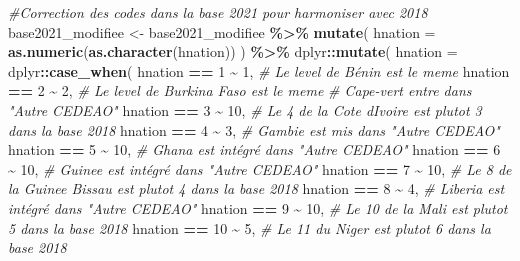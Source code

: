 \documentclass[
]{article}
\newenvironment{Shaded}{\begin{snugshade}}{\end{snugshade}}
\newcommand{\AttributeTok}[1]{\textcolor[rgb]{0.13,0.29,0.53}{#1}}
\newcommand{\CommentTok}[1]{\textcolor[rgb]{0.56,0.35,0.01}{\textit{#1}}}
\newcommand{\DecValTok}[1]{\textcolor[rgb]{0.00,0.00,0.81}{#1}}
\newcommand{\FunctionTok}[1]{\textcolor[rgb]{0.13,0.29,0.53}{\textbf{#1}}}
\newcommand{\NormalTok}[1]{#1}
\newcommand{\OtherTok}[1]{\textcolor[rgb]{0.56,0.35,0.01}{#1}}
\newcommand{\SpecialCharTok}[1]{\textcolor[rgb]{0.81,0.36,0.00}{\textbf{#1}}}
\begin{document}
\begin{Shaded}
\begin{Highlighting}[]
\CommentTok{\#Correction des codes dans la base 2021 pour harmoniser avec 2018}
\NormalTok{base2021\_modifiee }\OtherTok{\textless{}{-}}\NormalTok{ base2021\_modifiee }\SpecialCharTok{\%\textgreater{}\%}
  \FunctionTok{mutate}\NormalTok{(}
    \AttributeTok{hnation =} \FunctionTok{as.numeric}\NormalTok{(}\FunctionTok{as.character}\NormalTok{(hnation))}
\NormalTok{  ) }\SpecialCharTok{\%\textgreater{}\%}
\NormalTok{dplyr}\SpecialCharTok{::}\FunctionTok{mutate}\NormalTok{(}
    \AttributeTok{hnation =}\NormalTok{ dplyr}\SpecialCharTok{::}\FunctionTok{case\_when}\NormalTok{(}
\NormalTok{      hnation }\SpecialCharTok{==} \DecValTok{1} \SpecialCharTok{\textasciitilde{}} \DecValTok{1}\NormalTok{,    }\CommentTok{\# Le level de Bénin est le meme}
\NormalTok{      hnation }\SpecialCharTok{==} \DecValTok{2} \SpecialCharTok{\textasciitilde{}} \DecValTok{2}\NormalTok{,    }\CommentTok{\# Le level de Burkina Faso est le meme}
      \CommentTok{\# Cape{-}vert entre dans "Autre CEDEAO"}
\NormalTok{      hnation }\SpecialCharTok{==} \DecValTok{3} \SpecialCharTok{\textasciitilde{}} \DecValTok{10}\NormalTok{,}
      \CommentTok{\# Le 4 de la Cote d\textquotesingle{}Ivoire est plutot 3 dans la base 2018}
\NormalTok{      hnation }\SpecialCharTok{==} \DecValTok{4} \SpecialCharTok{\textasciitilde{}} \DecValTok{3}\NormalTok{,   }
      \CommentTok{\# Gambie est mis dans "Autre CEDEAO"}
\NormalTok{      hnation }\SpecialCharTok{==} \DecValTok{5} \SpecialCharTok{\textasciitilde{}} \DecValTok{10}\NormalTok{,}
      \CommentTok{\# Ghana est intégré dans "Autre CEDEAO"}
\NormalTok{      hnation }\SpecialCharTok{==} \DecValTok{6} \SpecialCharTok{\textasciitilde{}} \DecValTok{10}\NormalTok{,  }
      \CommentTok{\# Guinee est intégré dans "Autre CEDEAO"}
\NormalTok{      hnation }\SpecialCharTok{==} \DecValTok{7} \SpecialCharTok{\textasciitilde{}} \DecValTok{10}\NormalTok{,}
      \CommentTok{\# Le 8 de la Guinee Bissau est plutot 4 dans la base 2018}
\NormalTok{      hnation }\SpecialCharTok{==} \DecValTok{8} \SpecialCharTok{\textasciitilde{}} \DecValTok{4}\NormalTok{,    }
      \CommentTok{\# Liberia est intégré dans "Autre CEDEAO"}
\NormalTok{      hnation }\SpecialCharTok{==} \DecValTok{9} \SpecialCharTok{\textasciitilde{}} \DecValTok{10}\NormalTok{,}
      \CommentTok{\# Le 10 de la Mali est plutot 5 dans la base 2018}
\NormalTok{      hnation }\SpecialCharTok{==} \DecValTok{10} \SpecialCharTok{\textasciitilde{}} \DecValTok{5}\NormalTok{,   }
      \CommentTok{\# Le 11 du Niger est plutot 6 dans la base 2018}

\end{Highlighting}
\end{Shaded}
\end{document}
